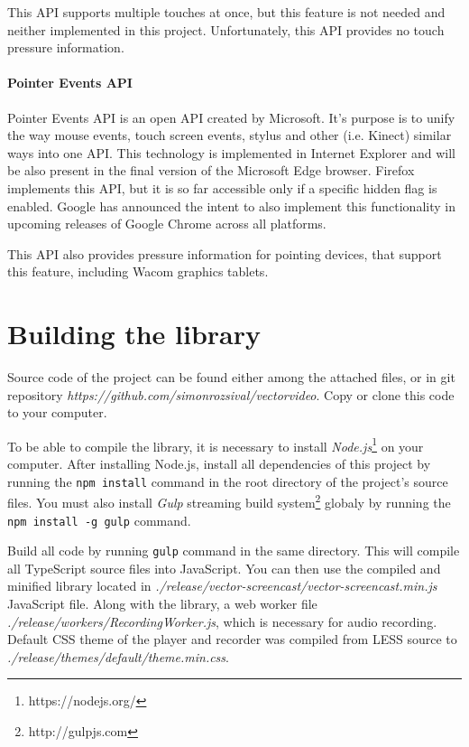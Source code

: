 {This API supports multiple touches at once, but this feature is not needed and neither implemented in this project. Unfortunately, this API provides no touch pressure information.

\paragraph{Pointer Events API}
Pointer Events API is an open API created by Microsoft. It's purpose is to unify the way mouse events, touch screen events, stylus and other (i.e. Kinect) similar ways into one API. This technology is implemented in Internet Explorer and will be also present in the final version of the Microsoft Edge browser. Firefox implements this API, but it is so far accessible only if a specific hidden flag is enabled. Google has announced the intent to also implement this functionality in upcoming releases of Google Chrome across all platforms.

This API also provides pressure information for pointing devices, that support this feature, including Wacom graphics tablets.



\section{Building the library}

Source code of the project can be found either among the attached files, or in git repository \textit{https://github.com/simonrozsival/vectorvideo}. Copy or clone this code to your computer.

To be able to compile the library, it is necessary to install \textit{Node.js}\footnote{https://nodejs.org/} on your computer. After installing Node.js, install all dependencies of this project by running the \verb|npm install| command in the root directory of the project's source files. You must also install \textit{Gulp} streaming build system\footnote{http://gulpjs.com} globaly by running the \verb|npm install -g gulp| command.

Build all code by running \verb|gulp| command in the same directory. This will compile all TypeScript source files into JavaScript. You can then use the compiled and minified library located in \textit{./release/vector-screencast/vector-screencast.min.js} JavaScript file. Along with the library, a web worker file \textit{./release/workers/RecordingWorker.js}, which is necessary for audio recording. Default CSS theme of the player and recorder was compiled from LESS source to \textit{./release/themes/default/theme.min.css}.

}
